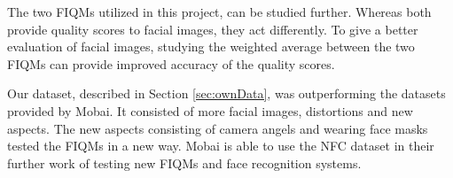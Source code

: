 The two FIQMs utilized in this project, can be studied further. Whereas both provide quality scores to facial images, they act differently. To give a better evaluation of facial images, studying the weighted average between the two FIQMs can provide improved accuracy of the quality scores. 

Our dataset, described in Section \ref{sec:ownData}, was outperforming the datasets provided by Mobai. It consisted of more facial images, distortions and new aspects. The new aspects consisting of camera angels and wearing face masks tested the FIQMs in a new way. Mobai is able to use the NFC dataset in their further work of testing new FIQMs and face recognition systems. 
